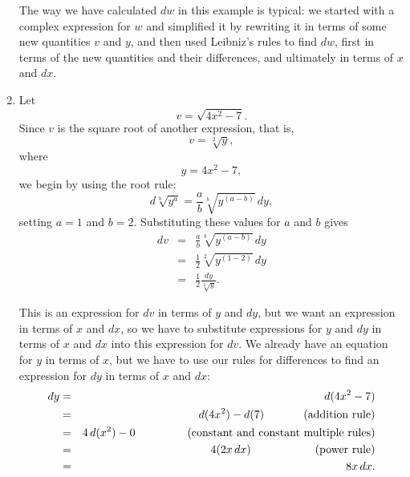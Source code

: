 \documentclass[twoside,openright]{article}
\newlength{\oldjot}
\begin{document}
\begin{enumerate}
The way we have calculated $dw$ in this example is typical: we started
with a complex expression for $w$ and simplified it by rewriting it in
terms of some new quantities $v$ and $y$, and then used Leibniz's
rules to find $dw$, first in terms of the new quantities and their
differences, and ultimately in terms of $x$ and $dx$. 

\item \label{ex4} Let $$v = \sqrt{4x^2 - 7}.$$
Since $v$ is the square root of another expression, that is,
$$v = \sqrt[2]{y},$$
where 
$$y = 4x^2 - 7,$$
we begin by using the root rule:
$$d\sqrt[b]{y^a} = \frac{a}{b}\sqrt[b]{y^{(a-b)}}\,dy,$$
setting $a= 1$ and $b= 2$.  Substituting these values for $a$ and $b$ gives
\setlength{\jot}{2ex}
\begin{eqnarray*}
dv & = & \frac{a}{b}\sqrt[b]{y^{(a-b)}}\,dy \\
  & = & \frac{1}{2}\sqrt[2]{y^{(1-2)}}\,dy \\
      & = & \frac{1}{2}\frac{dy}{\sqrt[2]{y}}. 
\end{eqnarray*}
\setlength{\jot}{\oldjot}

This is an expression for $dv$ in terms of $y$ and $dy$, but we want
an expression in terms of $x$ and $dx$, so we have to substitute
expressions for $y$ and $dy$ in terms of $x$ and $dx$ into this
expression for $dv$.  We already have an equation for $y$ in terms of
$x$, but we have to use our rules for differences to find an
expression for $dy$ in terms of $x$ and $dx$:
\begin{eqnarray*}
dy & = & d(4x^2 -7)\\
 & = & d(4x^2) - d(7) \mbox{\hspace{7.4ex} (addition rule)}\\
 & = & 4\,d(x^2) - 0 \mbox{\hspace{10ex} (constant and constant multiple rules)}\\
 & = & 4(2x\,dx) \mbox{\hspace{12.5ex} (power rule)}\\
 & = & 8x\,dx.
 \end{eqnarray*}



\end{enumerate}
\end{document}

